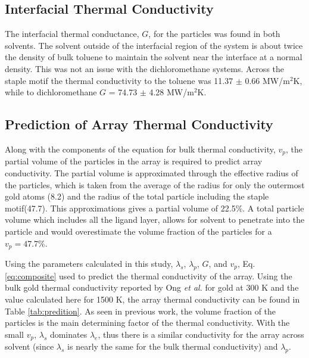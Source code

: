 \subsection{Interfacial Thermal Conductivity}
The interfacial thermal conductance, $G$, for the particles was found in both solvents.
The solvent outside of the interfacial region of the system is about twice the density of bulk toluene to maintain the solvent near the interface at a normal density.
This was not an issue with the dichloromethane systems. 
Across the staple motif the thermal conductivity to the toluene was 11.37 $\pm$ 0.66 MW/m$^2$K, while to dichloromethane $G$ = 74.73 $\pm$ 4.28 MW/m$^2$K.

\subsection{Prediction of Array Thermal Conductivity}
Along with the components of the equation for bulk thermal conductivity, $v_p$, the partial volume of the  particles in the array is required to predict array conductivity.
The partial volume is approximated through the effective radius of the particles, which is taken from the average of the radius for only the outermost gold atoms (8.2) and the radius of the total particle including the staple motif(47.7).
This approximations gives a partial volume of 22.5\%.
A total particle volume which includes all the ligand layer, allows for solvent to penetrate into the particle and would overestimate the volume fraction of the particles for a $v_p = 47.7\%$.

Using the parameters calculated in this study, $\lambda_s$, $\lambda_p$, $G$, and $v_p$, Eq.\ref{eq:composite} used to predict the thermal conductivity of the array.
Using the bulk gold thermal conductivity reported by Ong \textit{et al.} for gold at 300 K and the value calculated here for 1500 K, the array thermal conductivity can be found in Table \ref{tab:predition}.
As seen in previous work,\cite{Ong:2014yq, Liu2015, Zanjani2014} the volume fraction of the particles is the main determining factor of the thermal conductivity. 
With the small $v_p$, $\lambda_s$ dominates $\lambda_e$, thus there is a similar conductivity for the array across solvent (since $\lambda_s$ is nearly the same for the bulk thermal conductivity) and $\lambda_p$.

